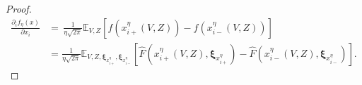 \documentclass[11pt,reqno]{amsart}
\newcommand{\1}{{\bf 1}}
\newcommand{\2}{{\bf 2}}
\newcommand{\bxi}{\boldsymbol{\xi}}
\numberwithin{equation}{section}
\theoremstyle{remark}
\begin{document}
{\begin{proof}
				\begin{align*}
					\tfrac{\partial_i f_{\eta}(x)}{\partial x_i}&=
					\, \tfrac{1}{\eta \sqrt{2\pi}}\mathbb{E}_{V,Z}\left[f\left(x_{i+}^{\eta}(V,Z)\right)-f\left(x_{i-}^{\eta}(V,Z) \right)\right] \\
					&=\tfrac{1}{\eta\sqrt{2\pi}}\mathbb{E}_{V,Z,\bxi_{x_{i+}^\eta},\bxi_{x_{i-}^\eta}}\left[\hat{F}\left(x_{i+}^\eta(V,Z), \bxi_{x_{i+}^\eta}\right)-\hat{F}\left(x_{i-}^\eta(V,Z), \bxi_{x_{i-}^\eta}\right)\right].
				\end{align*}	%
				\end{proof}
				
}
\end{document}
